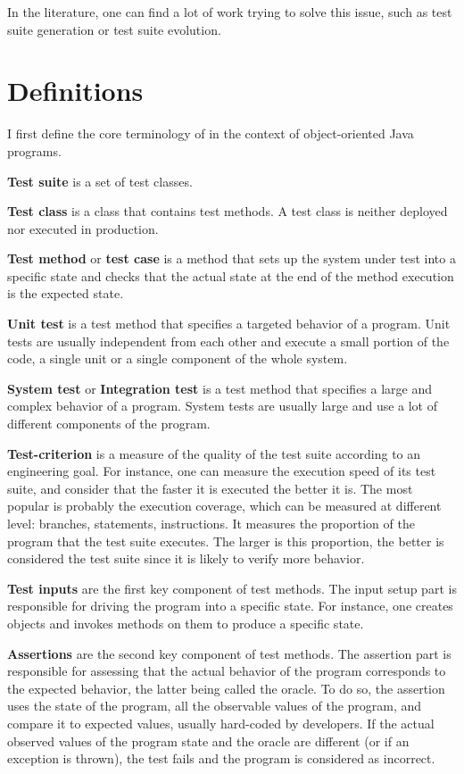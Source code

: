 In the literature, one can find a lot of work trying to solve this issue, such as test suite generation or test suite evolution.


\section{Definitions}
\label{sec:dspot:definitions}

I first define the core terminology of \dspot in the context of object-oriented Java programs.

\textbf{Test suite} is a set of test classes.

\textbf{Test class} is a class that contains test methods. 
A test class is neither deployed nor executed in production.

\textbf{Test method} or \textbf{test case} is a method that sets up the system under test into a specific state and checks that the actual state at the end of the method execution is the expected state.

\textbf{Unit test} is a test method that specifies a targeted behavior of a program. 
Unit tests are usually independent from each other and execute a small portion of the code, \ie a single unit or a single component of the whole system.

\textbf{System test} or \textbf{Integration test} is a test method that specifies a large and complex behavior of a program.
System tests are usually large and use a lot of different components of the program.

\textbf{Test-criterion} is a measure of the quality of the test suite according to an engineering goal.
For instance, one can measure the execution speed of its test suite, and consider that the faster it is executed the better it is.
The most popular is probably the execution coverage, which can be measured at different level: branches, statements, instructions.
It measures the proportion of the program that the test suite executes.
The larger is this proportion, the better is considered the test suite since it is likely to verify more behavior.

\textbf{Test inputs} are the first key component of test methods. 
The input setup part is responsible for driving the program into a specific state.
For instance, one creates objects and invokes methods on them to produce a specific state.

\textbf{Assertions} are the second key component of test methods. 
The assertion part is responsible for assessing that the actual behavior of the program corresponds to the expected behavior, the latter being called the oracle.
To do so, the assertion uses the state of the program, \ie all the observable values of the program, and compare it to expected values, usually hard-coded by developers.
If the actual observed values of the program state and the oracle are different (or if an exception is thrown), the test fails and the program is considered as incorrect.

